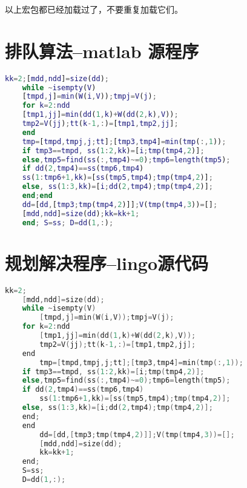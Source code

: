 \documentclass[withoutpreface,bwprint]{cumcmthesis} %
\begin{document}
\begin{appendices}
    以上宏包都已经加载过了，不要重复加载它们。
    
    \section{排队算法--matlab 源程序}
    
    \begin{lstlisting}[language=matlab]
    kk=2;[mdd,ndd]=size(dd);
    while ~isempty(V)
    [tmpd,j]=min(W(i,V));tmpj=V(j);
    for k=2:ndd
    [tmp1,jj]=min(dd(1,k)+W(dd(2,k),V));
    tmp2=V(jj);tt(k-1,:)=[tmp1,tmp2,jj];
    end
    tmp=[tmpd,tmpj,j;tt];[tmp3,tmp4]=min(tmp(:,1));
    if tmp3==tmpd, ss(1:2,kk)=[i;tmp(tmp4,2)];
    else,tmp5=find(ss(:,tmp4)~=0);tmp6=length(tmp5);
    if dd(2,tmp4)==ss(tmp6,tmp4)
    ss(1:tmp6+1,kk)=[ss(tmp5,tmp4);tmp(tmp4,2)];
    else, ss(1:3,kk)=[i;dd(2,tmp4);tmp(tmp4,2)];
    end;end
    dd=[dd,[tmp3;tmp(tmp4,2)]];V(tmp(tmp4,3))=[];
    [mdd,ndd]=size(dd);kk=kk+1;
    end; S=ss; D=dd(1,:);
     \end{lstlisting}
    
     \section{规划解决程序--lingo源代码}
    
    \begin{lstlisting}[language=c]
    kk=2;
    [mdd,ndd]=size(dd);
    while ~isempty(V)
        [tmpd,j]=min(W(i,V));tmpj=V(j);
    for k=2:ndd
        [tmp1,jj]=min(dd(1,k)+W(dd(2,k),V));
        tmp2=V(jj);tt(k-1,:)=[tmp1,tmp2,jj];
    end
        tmp=[tmpd,tmpj,j;tt];[tmp3,tmp4]=min(tmp(:,1));
    if tmp3==tmpd, ss(1:2,kk)=[i;tmp(tmp4,2)];
    else,tmp5=find(ss(:,tmp4)~=0);tmp6=length(tmp5);
    if dd(2,tmp4)==ss(tmp6,tmp4)
        ss(1:tmp6+1,kk)=[ss(tmp5,tmp4);tmp(tmp4,2)];
    else, ss(1:3,kk)=[i;dd(2,tmp4);tmp(tmp4,2)];
    end;
    end
        dd=[dd,[tmp3;tmp(tmp4,2)]];V(tmp(tmp4,3))=[];
        [mdd,ndd]=size(dd);
        kk=kk+1;
    end;
    S=ss;
    D=dd(1,:);
     \end{lstlisting}
    \end{appendices}
    
    
 
 
\end{document}
